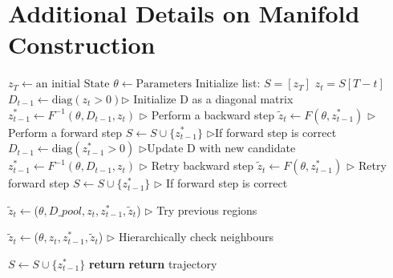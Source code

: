\documentclass{article}
\theoremstyle{example}
\theoremstyle{plain}
\theoremstyle{definition}
\theoremstyle{remark}
\begin{document}
\section{Additional Details on Manifold Construction}
\label{sec: additional algorithm}
\begin{algorithm*}[!b]%
\caption{Backtracking Time Series in a ReLU based RNNs}
\label{Alg:back}
\begin{algorithmic}[1]
   \State $z_{T} \gets \text{an initial State}$
   \State $\theta \gets \text{Parameters}$
    \State Initialize list: $S = [ z_T ]$
        \State $z_t = S[T-t]$
        \State $D_{t-1} \gets \text{diag}(z_{t} > 0)$\hfill $\triangleright$ Initialize D as a diagonal matrix
        \State $z^*_{t-1} \gets F^{-1}(\theta,D_{t-1},z_t)$ \hfill $\triangleright$ Perform a backward step
        \State $\tilde{z}_t \gets F(\theta,z^*_{t-1})$ \hfill $\triangleright$Perform a forward step
            \State $S \gets S \cup \{z^*_{t-1}\}$ \hfill $\triangleright$If forward step is correct
        \Else
            \State $D_{t-1} \gets \text{diag}(z^*_{t-1} > 0)$ \hfill $\triangleright$Update D with new candidate
             \State $z^*_{t-1} \gets  F^{-1}(\theta,D_{t-1},z_t)$ \hfill $\triangleright$ Retry backward step
            \State $\tilde{z}_t \gets F(\theta,z^*_{t-1})$ \hfill $\triangleright$ Retry forward step
                \State $S \gets S \cup \{z^*_{t-1}\}$ \hfill $\triangleright$ If forward step is correct
            \Else
                
            \State $\tilde{z}_t \gets $($\theta, D\_pool, z_t, z^*_{t-1}, \tilde{z}_t$) \hfill $\triangleright$ Try previous regions
        
                     \State  $\tilde{z}_t \gets$($\theta, z_t, z^*_{t-1}, \tilde{z}_t$) \hfill $\triangleright$ Hierarchically check neighbours
            
                        \State $S \gets S \cup \{z^*_{t-1}\}$
                    \Else
                        \State \textbf{return} %
                    \EndIf
                \EndIf
            \EndIf
        \EndIf
    \EndFor
    \State \textbf{return} trajectory
\end{algorithmic}
\end{algorithm*}
\end{document}
